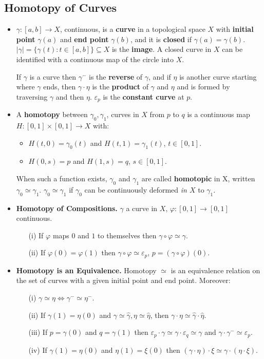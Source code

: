 \documentclass{article}
\newenvironment{topic}[1]{%
{\subsection{#1}}%
\begin{itemize}%
}{%
\end{itemize}%
}
\newcommand{\theorem}[1]{\item {\bf #1.}}
\newcommand{\lemma}[1]{\item {\bf #1.}}
\newcommand{\term}[1]{{\bf #1}}
\newcommand{\remark}{\item}
\begin{document}
\begin{topic}{Homotopy of Curves}

\remark $\gamma : [a, b] \to X$, continuous, is a \term{curve} in a topological space $X$ with \term{initial point} $\gamma(a)$ and \term{end point} $\gamma(b)$, and it is \term{closed} if $\gamma(a) = \gamma(b)$. $|\gamma| = \{ \gamma(t) : t \in [a, b] \} \subseteq X$ is the \term{image}. A closed curve in $X$ can be identified with a continuous map of the circle into $X$.

If $\gamma$ is a curve then $\gamma^-$ is the \term{reverse} of $\gamma$, and if $\eta$ is another curve starting where $\gamma$ ends, then $\gamma \cdot \eta$ is the \term{product} of $\gamma$ and $\eta$ and is formed by traversing $\gamma$ and then $\eta$. $\varepsilon_p$ is the \term{constant curve} at $p$.

\remark A \term{homotopy} between $\gamma_0, \gamma_1$, curves in $X$ from $p$ to $q$ is a continuous map $H : [0, 1] \times [0, 1] \to X$ with:
\begin{itemize}
\item $H(t, 0) = \gamma_0(t)$ and $H(t, 1) = \gamma_1(t)$, $t \in [0, 1]$.
\item $H(0, s) = p$ and $H(1, s) = q$, $s \in [0, 1]$.
\end{itemize}
When such a function exists, $\gamma_0$ and $\gamma_1$ are called \term{homotopic} in X, written $\gamma_0 \simeq \gamma_1$. $\gamma_0 \simeq \gamma_1$ if $\gamma_0$ can be continuously deformed {\em in $X$} to $\gamma_1$.

\lemma{Homotopy of Compositions} $\gamma$ a curve in $X$, $\varphi : [0, 1] \to [0, 1]$ continuous.
\begin{enumerate}
\item[(i)] If $\varphi$ maps $0$ and $1$ to themselves then $\gamma \circ \varphi \simeq \gamma$.
\item[(ii)] If $\varphi(0) = \varphi(1)$ then $\gamma \circ \varphi \simeq \varepsilon_p$, $p = (\gamma \circ \varphi)(0)$.
\end{enumerate}

\theorem{Homotopy is an Equivalence} Homotopy $\simeq$ is an equivalence relation on the set of curves with a given initial point and end point. Moreover:
\begin{enumerate}
\item[(i)] $\gamma \simeq \eta \iff \gamma^- \simeq \eta^-$.
\item[(ii)] If $\gamma(1) = \eta(0)$ and $\gamma \simeq \hat\gamma, \eta \simeq \hat\eta$, then $\gamma \cdot \eta \simeq \hat\gamma \cdot \hat\eta$.
\item[(iii)] If $p = \gamma(0)$ and $q = \gamma(1)$ then $\varepsilon_p \cdot \gamma \simeq \gamma \cdot \varepsilon_q \simeq \gamma$ and $\gamma \cdot \gamma^- \simeq \varepsilon_p$.
\item[(iv)] If $\gamma(1) = \eta(0)$ and $\eta(1) = \xi(0)$ then $(\gamma \cdot \eta) \cdot \xi \simeq \gamma \cdot (\eta \cdot \xi)$.
\end{enumerate}


\end{topic}
\end{document}

